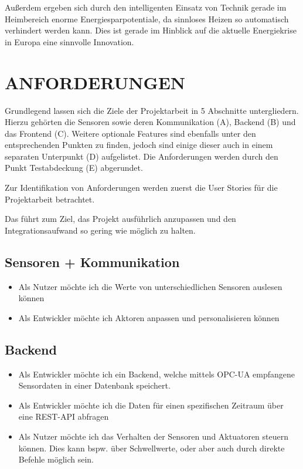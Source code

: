 \documentclass[letterpaper, 10 pt, conference]{ieeeconf}  %
\begin{document}
Außerdem ergeben sich durch den intelligenten Einsatz von Technik gerade im Heimbereich enorme Energiesparpotentiale, da sinnloses Heizen so automatisch verhindert werden kann. 
Dies ist gerade im Hinblick auf die aktuelle Energiekrise in Europa eine sinnvolle Innovation. 




\section{ANFORDERUNGEN}

Grundlegend lassen sich die Ziele der Projektarbeit in 5 Abschnitte untergliedern. Hierzu gehörten die Sensoren sowie deren Kommunikation (A), Backend (B) und das Frontend (C). Weitere optionale Features sind ebenfalls unter den entsprechenden Punkten zu finden, jedoch sind einige dieser auch in einem separaten Unterpunkt (D) aufgelistet. Die Anforderungen werden durch den Punkt Testabdeckung (E) abgerundet.

Zur Identifikation von Anforderungen werden zuerst die User Stories für die Projektarbeit betrachtet.

Das führt zum Ziel, das Projekt ausführlich anzupassen und den Integrationsaufwand so gering wie möglich zu halten. 

\subsection{Sensoren + Kommunikation} 
\begin{itemize}
    \item Als Nutzer möchte ich die Werte von unterschiedlichen Sensoren auslesen können
    \item Als Entwickler möchte ich Aktoren anpassen und personalisieren können
\end{itemize}

\subsection{Backend}
\begin{itemize}
\item Als Entwickler möchte ich ein Backend, welche mittels OPC-UA empfangene Sensordaten in einer Datenbank speichert. 
\item Als Entwickler möchte ich die Daten für einen spezifischen Zeitraum über eine REST-API abfragen
\item Als Nutzer möchte ich das Verhalten der Sensoren und Aktuatoren steuern können. Dies kann bspw. über Schwellwerte, oder aber auch durch direkte Befehle möglich sein.
\end{itemize}
\end{document}
